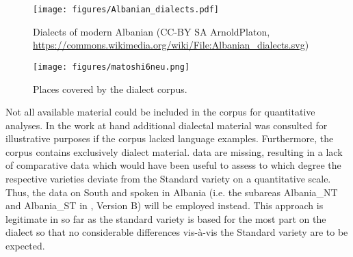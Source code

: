\documentclass[output=paper]{langsci/langscibook}
\begin{document}
\begin{figure}[p]
\texttt{[image: figures/Albanian\_dialects.pdf]}
\caption{Dialects of modern Albanian (CC-BY SA ArnoldPlaton, \url{https://commons.wikimedia.org/wiki/File:Albanian_dialects.svg})\label{fig5}}
\end{figure}

\begin{figure}[p]
\texttt{[image: figures/matoshi6neu.png]}
\caption{Places covered by the dialect corpus.\label{fig6}}
\end{figure}


Not all available material could be included in the corpus for quantitative analyses. In the work at hand additional dialectal material was consulted for illustrative purposes if the corpus lacked language examples. Furthermore, the corpus contains exclusively dialect material.  data are missing, resulting in a lack of comparative data which would have been useful to assess to which degree the respective varieties deviate from the Standard variety on a quantitative scale. Thus, the data on South and  spoken in Albania (i.e. the subareas Albania\_NT and Albania\_ST in , Version B) will be employed instead. This approach is legitimate in so far as the  standard variety is based for the most part on the  dialect so that no considerable differences vis-à-vis the Standard variety are to be expected.
\end{document}
